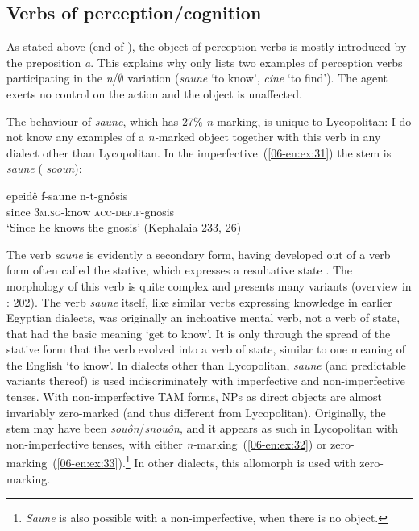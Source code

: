 \documentclass[output=paper]{LSP/langsci}
\begin{document}
\largerpage
\subsection{Verbs of perception/cognition}
\label{06-en-sec:5-3}

As stated above (end of ), the object of perception verbs is mostly introduced by the preposition \textit{a}. This explains why  only lists two examples of perception verbs participating in the \textit{n}/${\emptyset}$ variation (\textit{saune} ‘to know’, \textit{cine} ‘to find’). The agent exerts no control on the action and the object is unaffected.

The behaviour of \textit{saune}, which has 27\% \textit{n-}marking, is unique to Lycopolitan: I do not know any examples of a \textit{n-}marked object together with this verb in any dialect other than Lycopolitan. In the imperfective~(\ref{06-en:ex:31}) the stem is \textit{saune} ( \textit{sooun}):

\begin{exe}
\ex \label{06-en:ex:31}
\gll {\ob}e{\cb}peidê 	f-saune 		n-t-gnôsis\\
	since \textsc{3m.sg-}know \textsc{acc-def.f-}gnosis\\
\glt ‘Since he knows the gnosis’ (Kephalaia 233, 26) 
\end{exe}

The verb \textit{saune} is evidently a secondary form, having developed out of a verb form often called the stative, which expresses a resultative state \citep[163]{Peust2013Etymologie}. The morphology of this verb is quite complex and presents many variants (overview in \citealt{Vycichl1983Dictionnaire}: 202). The verb \textit{saune} itself, like similar verbs expressing knowledge in earlier Egyptian dialects, was originally an inchoative mental verb, not a verb of state, that had the basic meaning ‘get to know’. It is only through the spread of the stative form that the verb evolved into a verb of state, similar to one meaning of the English ‘to know’. In dialects other than Lycopolitan, \textit{saune} (and predictable variants thereof) is used indiscriminately with imperfective and non-imperfective tenses. With non-imperfective TAM forms, NPs as direct objects are almost invariably zero-marked (and thus different from Lycopolitan). Originally, the stem may have been \textit{souôn}/\textit{snouôn}, and it appears as such in Lycopolitan with non-imperfective tenses, with either \textit{n-}marking~(\ref{06-en:ex:32}) or zero-marking~(\ref{06-en:ex:33}).\footnote{\textit{S}\textit{aune} is also possible with a non-imperfective, when there is no object.} In other dialects, this allomorph is used with zero-marking.
\end{document}
